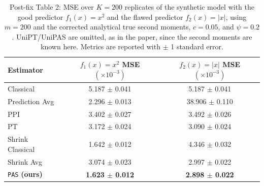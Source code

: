 \begin{table}[H]
    \centering
    \caption{Post-fix Table 2: MSE over $K = 200$ replicates of the synthetic model with the good predictor $f_1(x) = x^2$ and the flawed predictor $f_2(x) = |x|$, using $m=200$ and the corrected analytical true second moments, $c=0.05$, and $\psi=0.2$. UniPT/UniPAS are omitted, as in the paper, since the second moments are known here. Metrics are reported with $\pm$ 1 standard error.}
    \label{tbl:postfix_synthetic}
    \vskip 0.05in
    \footnotesize
    \begin{tabular}{lcc}
    \toprule
    \textbf{Estimator} & \textbf{$f_1(x) = x^2$} \textbf{MSE} \( (\times 10^{-3}) \) & \textbf{$f_2(x) = |x|$} \textbf{MSE} \( (\times 10^{-3}) \) \\
    \midrule
    Classical & 5.187 $\pm$ 0.041 & 5.187 $\pm$ 0.041 \\
    Prediction Avg & 2.296 $\pm$ 0.013 & 38.906 $\pm$ 0.110 \\
    PPI & 3.402 $\pm$ 0.027 & 3.492 $\pm$ 0.026 \\
    PT & 3.172 $\pm$ 0.024 & 3.090 $\pm$ 0.024 \\
    Shrink Classical & 1.642 $\pm$ 0.012 & 4.346 $\pm$ 0.032 \\
    Shrink Avg & 3.074 $\pm$ 0.023 & 2.997 $\pm$ 0.022 \\
    \texttt{PAS} \textbf{(ours)} & \textbf{1.623 $\pm$ 0.012} & \textbf{2.898 $\pm$ 0.022} \\
    \bottomrule
    \end{tabular}
\end{table}

